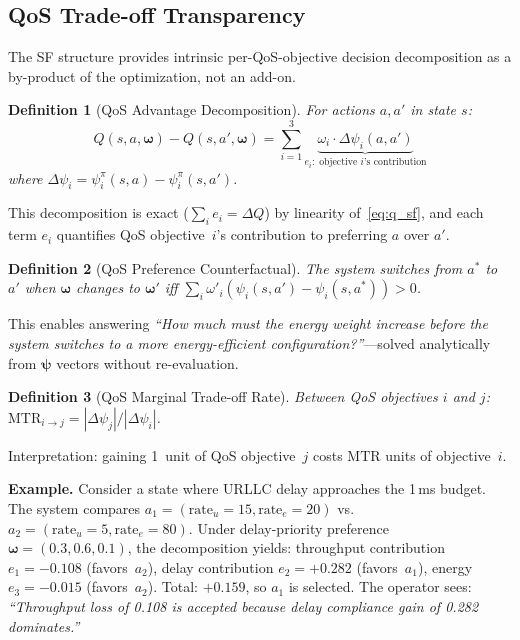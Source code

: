 \documentclass[conference]{IEEEtran}
\newcommand{\vomega}{\boldsymbol{\omega}}
\newcommand{\vpsi}{\boldsymbol{\psi}}
\newtheorem{definition}{Definition}
\begin{document}
\subsection{QoS Trade-off Transparency}\label{sec:explain}

The SF structure provides intrinsic per-QoS-objective decision decomposition as a by-product of the optimization, not an add-on.

\begin{definition}[QoS Advantage Decomposition]
\label{def:qad}
For actions $a, a'$ in state $s$:
\begin{equation}
Q(s,a,\vomega) - Q(s,a',\vomega) = \sum_{i=1}^{3} \underbrace{\omega_i \cdot \Delta\psi_i(a,a')}_{e_i:\;\text{objective } i\text{'s contribution}}
\label{eq:decomp}
\end{equation}
where $\Delta\psi_i = \psi_i^\pi(s,a) - \psi_i^\pi(s,a')$.
\end{definition}

This decomposition is exact ($\sum_i e_i = \Delta Q$) by linearity of~\eqref{eq:q_sf}, and each term $e_i$ quantifies QoS objective~$i$'s contribution to preferring $a$ over $a'$.

\begin{definition}[QoS Preference Counterfactual]
\label{def:counter}
The system switches from $a^*$ to $a'$ when $\vomega$ changes to $\vomega'$ iff $\sum_i \omega'_i(\psi_i(s,a') - \psi_i(s,a^*)) > 0$.
\end{definition}

This enables answering \emph{``How much must the energy weight increase before the system switches to a more energy-efficient configuration?''}---solved analytically from $\vpsi$ vectors without re-evaluation.

\begin{definition}[QoS Marginal Trade-off Rate]
\label{def:mtr}
Between QoS objectives $i$ and $j$: $\mathrm{MTR}_{i\to j} = |\Delta\psi_j|/|\Delta\psi_i|$.
\end{definition}

Interpretation: gaining 1~unit of QoS objective~$j$ costs $\mathrm{MTR}$ units of objective~$i$.

\textbf{Example.}
Consider a state where URLLC delay approaches the 1\,ms budget.
The system compares $a_1{=}(\text{rate}_u{=}15, \text{rate}_e{=}20)$ vs.\ $a_2{=}(\text{rate}_u{=}5, \text{rate}_e{=}80)$.
Under delay-priority preference $\vomega{=}(0.3, 0.6, 0.1)$, the decomposition yields: throughput contribution $e_1{=}{-}0.108$ (favors~$a_2$), delay contribution $e_2{=}{+}0.282$ (favors~$a_1$), energy $e_3{=}{-}0.015$ (favors~$a_2$).
Total: ${+}0.159$, so $a_1$ is selected.
The operator sees: \emph{``Throughput loss of 0.108 is accepted because delay compliance gain of 0.282 dominates.''}
\end{document}
